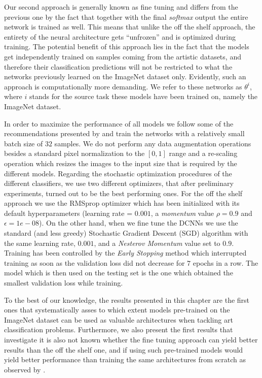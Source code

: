 Our second approach is generally known as fine tuning and differs from the previous one by the fact that together with the final \textit{softmax} output the entire network is trained as well. This means that unlike the off the shelf approach, the entirety of the neural architecture gets ``unfrozen'' and is optimized during training. The potential benefit of this approach lies in the fact that the models get independently trained on samples coming from the artistic datasets, and therefore their classification predictions will not be restricted to what the networks previously learned on the ImageNet dataset only. Evidently, such an approach is computationally more demanding. We refer to these networks as $\theta^{i}$, where $i$ stands for the source task these models have been trained on, namely the ImageNet dataset.

In order to maximize the performance of all models we follow some of the recommendations presented by \citet{masters2018revisiting} and train the networks with a relatively small batch size of $32$ samples. We do not perform any data augmentation operations besides a standard pixel normalization to the $[0, 1]$ range and a re-scaling operation which resizes the images to the input size that is required by the different models. Regarding the stochastic optimization procedures of the different classifiers, we use two different optimizers, that after preliminary experiments, turned out to be the best performing ones. For the off the shelf approach we use the RMSprop optimizer \cite{tieleman2012lecture} which has been initialized with its default hyperparameters (learning rate = $0.001$, a \textit{momentum} value $\rho = 0.9$ and $\epsilon =1e-08$). On the other hand, when we fine tune the DCNNs we use the standard (and less greedy) Stochastic Gradient Descent (SGD) algorithm with the same learning rate, $0.001$, and a \textit{Nesterov Momentum} value set to $0.9$.
Training has been controlled by the \textit{Early Stopping} method \cite{caruana2001overfitting} which interrupted training as soon as the validation loss did not decrease for $7$ epochs in a row. The model which is then used on the testing set is the one which obtained the smallest validation loss while training.

To the best of our knowledge, the results presented in this chapter are the first ones that systematically asses to which extent models pre-trained on the ImageNet dataset can be used as valuable architectures when tackling art classification problems. Furthermore, we also present the first results that investigate it is also not known whether the fine tuning approach can yield better results than the off the shelf one, and if using such pre-trained models would yield better performance than training the same architectures from scratch as observed by \citet{kornblith2018better}.

